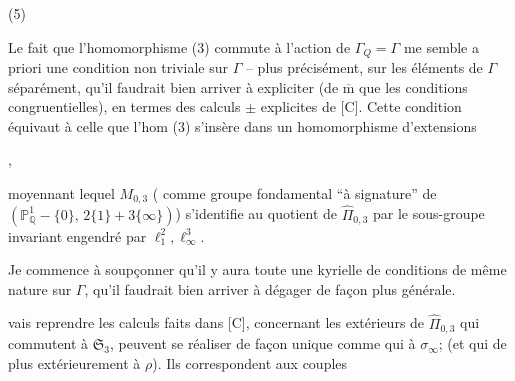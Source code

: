\begin{samepage}
(5)\quad
{}
\end{samepage}

Le fait que l'homomorphisme
(3) commute à l'action de $\Gamma_Q=\Gamma$
me semble  a priori une condition
non triviale sur $\Gamma$ -- plus
précisément, sur les éléments de
$\Gamma$ séparément, qu'il faudrait bien
arriver à expliciter (de $\overline{\mathrm m}$ que les
conditions congruentielles), en
termes des calculs $\pm$ explicites
de [C]. Cette condition équivaut
à celle que l'hom (3) s'insère
dans un homomorphisme d'extensions



,

moyennant lequel $M_{0,3}$ ( comme groupe fondamental ``à signature'' de $(\mathbb P^1_{\mathbb Q}-\{0\},\,2\{1\}+3\{\infty\})$) s'identifie au quotient de $\widehat{\Pi}_{0,3}$ par le sous-groupe invariant  engendré par $\ell_1^2,\ell_\infty^3$.

Je commence à soupçonner qu'il y aura toute une kyrielle de conditions de même nature sur $\Gamma$, qu'il faudrait bien arriver à dégager de façon plus générale.


 vais reprendre les calculs faits dans [C], concernant les  extérieurs de $\widehat{\Pi}_{0,3}$ qui commutent à $\mathfrak S_3$,   peuvent se réaliser de façon unique comme    qui  à $\sigma_\infty$; (et qui de plus  extérieurement à $\rho$). Ils correspondent  aux couples

